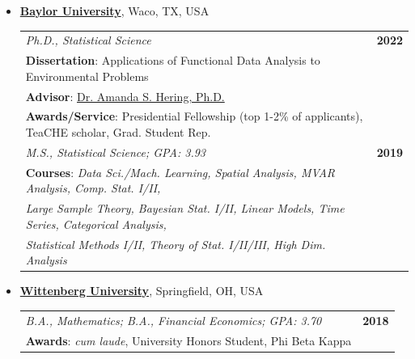 \documentclass{article}
\begin{document}
\begin{itemize}[leftmargin=*]
	\item  \href{https://www.baylor.edu/}{\textbf{Baylor University}}, Waco, TX, USA
	\begin{tabular*}{0.97\textwidth}{l@{\extracolsep{\fill}}r}
	\textit{Ph.D., Statistical Science} & \textbf{2022} \\
		\hspace{10px} \small \textbf{Dissertation}: Applications of Functional Data Analysis to Environmental Problems & \\
		\hspace{10px} \small \textbf{Advisor}: \href{https://sites.baylor.edu/mandy_hering/}{Dr. Amanda S. Hering, Ph.D.} & \\
		\hspace{10px} \small \textbf{Awards/Service}: Presidential Fellowship (top 1-2\% of applicants), TeaCHE scholar, Grad. Student Rep. & \\	

	\indent \textit{M.S., Statistical Science;  GPA: 3.93} & \textbf{2019} \\
		\hspace{10px} \small \textbf{Courses}: \textit{Data Sci./Mach. Learning, Spatial Analysis, MVAR Analysis, Comp. Stat. I/II,} & \\
	\hspace{10px} \small \textit{Large Sample Theory, Bayesian Stat. I/II, Linear Models, Time Series, Categorical Analysis,} & \\
	\hspace{10px} \small \textit{Statistical Methods I/II, Theory of Stat. I/II/III, High Dim. Analysis} & \\
	\end{tabular*}
	
	\item \href{https://www.wittenberg.edu/}{\textbf{Wittenberg University}}, Springfield, OH, USA
	\begin{tabular*}{0.97\textwidth}{l@{\extracolsep{\fill}}r}
	\textit{B.A., Mathematics; B.A., Financial Economics; GPA: 3.70} & \textbf{2018} \\
		\hspace{10px} \small \textbf{Awards}: \textit{cum laude}, University Honors Student, Phi Beta Kappa & \vspace{-4px}
	\end{tabular*}
\end{itemize}
\end{document}
